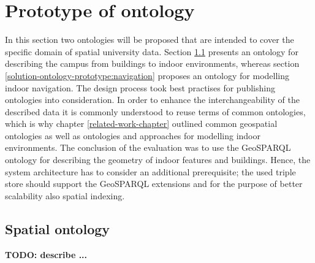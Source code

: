 \documentclass[draft,final]{vutinfth} %
\newcommand{\todo}[1]{{\color{red}\textbf{TODO: {#1}}}} %
\begin{document}
\section{Prototype of ontology}
\label{solution-ontology-prototype}
In this section two ontologies will be proposed that are intended to cover the specific domain of spatial university data. Section \ref{solution-ontology-prototype:spatial} presents an ontology for describing the campus from buildings to indoor environments, whereas section \ref{solution-ontology-prototype:navigation} proposes an ontology for modelling indoor navigation. The design process took best practises for publishing ontologies\cite{berrueta_best_2008} into consideration. In order to enhance the interchangeability of the described data it is commonly understood to reuse terms of common ontologies, which is why chapter \ref{related-work-chapter} outlined common geospatial ontologies as well as ontologies and approaches for modelling indoor environments. The conclusion of the evaluation was to use the GeoSPARQL ontology for describing the geometry of indoor features and buildings. Hence, the system architecture has to consider an additional prerequisite; the used triple store should support the GeoSPARQL extensions and for the purpose of better scalability also spatial indexing.

\subsection{Spatial ontology}
\label{solution-ontology-prototype:spatial}

\todo{describe ... }
\end{document}
